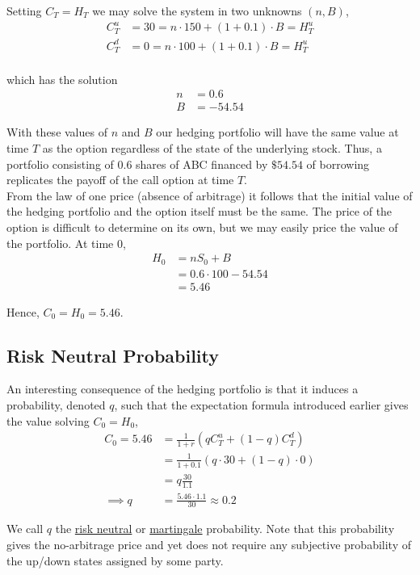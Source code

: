 \documentclass[12pt]{article}
\newlength\tindent
\renewcommand{\indent}{\hspace*{\tindent}}
\begin{document}
Setting $C_T = H_T$ we may solve the system in two unknowns $(n, B)$,
\begin{align*}
	C^u_T &= 30 = n\cdot 150 + (1 + 0.1)\cdot B = H^u_T \\
	C^d_T &= 0 = n\cdot 100 + (1 + 0.1)\cdot B = H^u_T \\
\end{align*}

which has the solution
\begin{align*}
	n &= 0.6 \\
	B &= -54.54
\end{align*}

\indent With these values of $n$ and $B$ our hedging portfolio will have the same value at time $T$ as the option regardless of the state of the underlying stock. Thus, a portfolio consisting of 0.6 shares of ABC financed by $\$54.54$ of borrowing replicates the payoff of the call option at time $T$. \\

\indent From the law of one price (absence of arbitrage) it follows that the initial value of the hedging portfolio and the option itself must be the same. The price of the option is difficult to determine on its own, but we may easily price the value of the portfolio. At time $0$,
\begin{align*}
	H_0 &= nS_0 + B \\
	&= 0.6\cdot 100 - 54.54 \\
	&= 5.46
\end{align*}

Hence, $C_0 = H_0 = 5.46$.

\subsection{Risk Neutral Probability}

\indent An interesting consequence of the hedging portfolio is that it induces a probability, denoted $q$, such that the expectation formula introduced earlier gives the value solving $C_0 = H_0$,
\begin{align*}
	C_0 = 5.46 &= \frac{1}{1 + r}\left( qC^u_T + (1 - q)C^d_T\right) \\
	&= \frac{1}{1 + 0.1} \left(q\cdot 30 + (1 - q)\cdot 0\right) \\ 
	&= q \frac{30}{1.1} \\
	\implies q &= \frac{5.46\cdot 1.1}{30} \approx 0.2
\end{align*}

\indent We call $q$ the \underline{risk neutral} or \underline{martingale} probability. Note that this probability gives the no-arbitrage price and yet does not require any subjective probability of the up/down states assigned by some party. \\
\end{document}

